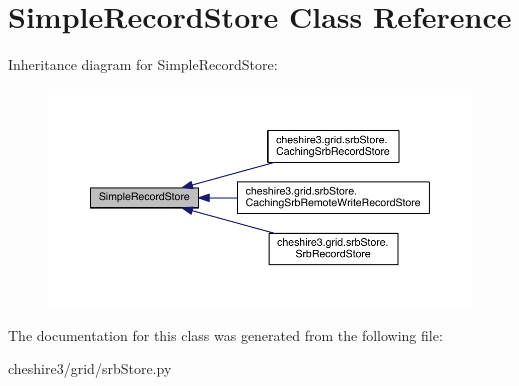 \hypertarget{class_simple_record_store}{\section{Simple\-Record\-Store Class Reference}
\label{class_simple_record_store}
}


Inheritance diagram for Simple\-Record\-Store\-:
\nopagebreak
\begin{figure}[H]
\begin{center}
\leavevmode
\includegraphics[width=350pt]{class_simple_record_store__inherit__graph}
\end{center}
\end{figure}


The documentation for this class was generated from the following file\-:\begin{DoxyCompactItemize}
\item 
cheshire3/grid/srb\-Store.\-py\end{DoxyCompactItemize}

